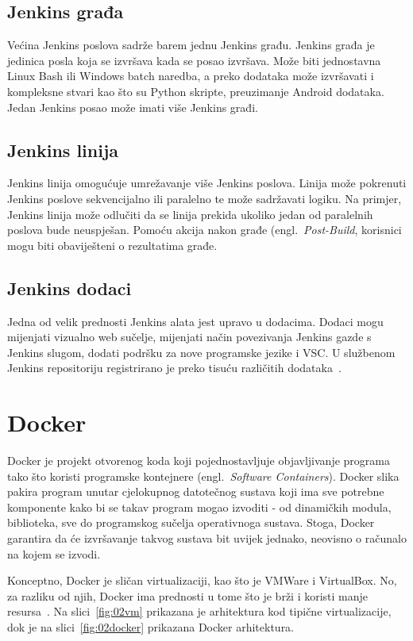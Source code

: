 \subsection{Jenkins građa}
Većina Jenkins poslova sadrže barem jednu Jenkins građu. Jenkins građa je jedinica posla koja se
izvršava kada se posao izvršava. Može biti jednostavna Linux Bash ili Windows batch naredba, a preko
dodataka može izvršavati i kompleksne stvari kao što su Python skripte, preuzimanje Android
dodataka. Jedan Jenkins posao može imati više Jenkins građi.

\subsection{Jenkins linija}
Jenkins linija omogućuje umrežavanje više Jenkins poslova. Linija može pokrenuti Jenkins poslove
sekvencijalno ili paralelno te može sadržavati logiku. Na primjer, Jenkins linija može odlučiti da
se linija prekida ukoliko jedan od paralelnih poslova bude neuspješan. Pomoću akcija nakon građe
(engl.~\textit{Post-Build}, korisnici mogu biti obaviješteni o rezultatima građe.

\subsection{Jenkins dodaci}
Jedna od velik prednosti Jenkins alata jest upravo u dodacima. Dodaci mogu mijenjati vizualno web
sučelje, mijenjati način povezivanja Jenkins gazde s Jenkins slugom, dodati podršku za nove
programske jezike i VSC. U službenom Jenkins repositoriju registrirano je preko tisuću različitih
dodataka~\citep{JenkisPlugins}.


\section{Docker}
Docker je projekt otvorenog koda koji pojednostavljuje objavljivanje programa tako što koristi
programske kontejnere (engl.~\textit{Software Containers}). Docker slika pakira program unutar
cjelokupnog datotečnog sustava koji ima sve potrebne komponente kako bi se takav program mogao
izvoditi - od dinamičkih modula, biblioteka, sve do programskog sučelja operativnoga sustava. Stoga,
Docker garantira da će izvršavanje takvog sustava bit uvijek jednako, neovisno o računalo na kojem
se izvodi.

Konceptno, Docker je sličan virtualizaciji, kao što je VMWare i VirtualBox. No, za razliku od njih,
Docker ima prednosti u tome što je brži i koristi manje resursa~\citep{leszko2017continuous}. Na
slici~\ref{fig:02vm} prikazana je arhitektura kod tipične virtualizacije, dok je na
slici~\ref{fig:02docker} prikazana  Docker arhitektura.

